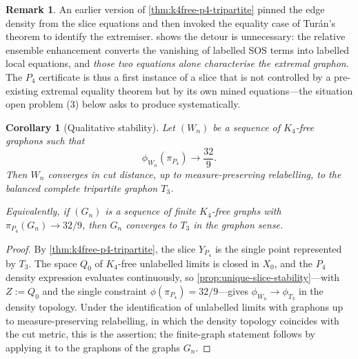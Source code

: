 \documentclass[11pt]{article}
\newtheorem{corollary}[corollary]{Corollary}
\theoremstyle{definition}
\newtheorem{remark}[remark]{Remark}
\begin{document}
\begin{remark}
An earlier version of \cref{thm:k4free-p4-tripartite} pinned the edge density from the
slice equations and then invoked the equality case of Tur\'an's theorem to identify the
extremiser.   shows the detour is unnecessary: the relative
ensemble enhancement converts the vanishing of labelled SOS terms into labelled local
equations, and \emph{those two equations alone characterise the extremal graphon}.  The
$P_4$ certificate is thus a first instance of a slice that is not controlled by a
pre-existing extremal equality theorem but by its own mined equations---the situation
open problem (3) below asks to produce systematically.
\end{remark}

\begin{corollary}[Qualitative stability]\label{cor:k4free-p4-qualitative-stability}
Let $(W_n)$ be a sequence of $K_4$-free graphons such that
\[
  \phi_{W_n}(\pi_{P_4})\longrightarrow \frac{32}{9}.
\]
Then $W_n$ converges in cut distance, up to measure-preserving relabelling, to the
balanced complete tripartite graphon $T_3$.

Equivalently, if $(G_n)$ is a sequence of finite $K_4$-free graphs with
$\pi_{P_4}(G_n)\to32/9$, then $G_n$ converges to $T_3$ in the graphon sense.
\end{corollary}

\begin{proof}
By \cref{thm:k4free-p4-tripartite}, the slice $Y_{P_4}$ is the single point represented
by $T_3$.  The space $Q_0$ of $K_4$-free unlabelled limits is closed in $X_0$, and the
$P_4$ density expression evaluates continuously, so
\cref{prop:unique-slice-stability}---with $Z:=Q_0$ and the single constraint
$\phi(\pi_{P_4})=32/9$---gives $\phi_{W_n}\to\phi_{T_3}$ in the density topology.  Under
the identification of unlabelled limits with graphons up to measure-preserving
relabelling, in which the density topology coincides with the cut metric, this is the
assertion; the finite-graph statement follows by applying it to the graphons of the
graphs $G_n$.
\end{proof}
\end{document}
